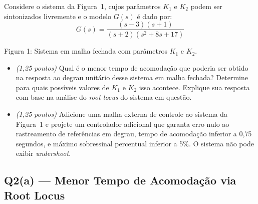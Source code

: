 \documentclass[12pt,a4paper]{article}
\begin{document}
\begin{enunciado}
Considere o sistema da Figura~1, cujos parâmetros $K_1$ e $K_2$ podem ser
sintonizados livremente e o modelo $G(s)$ é dado por:
\[
  G(s) = \frac{(s-3)(s+1)}{(s+2)(s^2 + 8s + 17)}
\]

\begin{center}

{\small Figura 1: Sistema em malha fechada com parâmetros $K_1$ e $K_2$.}
\end{center}

\begin{itemize}
  \item[(a)] \textit{(1{,}25 pontos)} Qual é o menor tempo de acomodação que
  poderia ser obtido na resposta ao degrau unitário desse sistema em malha
  fechada? Determine para quais possíveis valores de $K_1$ e $K_2$ isso
  acontece. Explique sua resposta com base na análise do \textit{root locus}
  do sistema em questão.
  \item[(b)] \textit{(1{,}25 pontos)} Adicione uma malha externa de controle
  ao sistema da Figura~1 e projete um controlador adicional que garanta erro
  nulo ao rastreamento de referências em degrau, tempo de acomodação inferior
  a 0{,}75 segundos, e máximo sobressinal percentual inferior a 5\%. O sistema
  não pode exibir \textit{undershoot}.
\end{itemize}
\end{enunciado}

\subsection*{Q2(a) — Menor Tempo de Acomodação via Root Locus}
\end{document}
